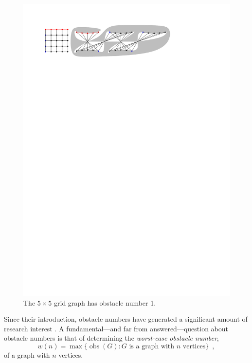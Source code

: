 \documentclass{patmorin}
\DeclareMathOperator{\obs}{obs}
\begin{document}
\begin{figure}
  \begin{center}
    \includegraphics{fivebyfive}
  \end{center}  
  \caption{The $5\times 5$ grid graph has obstacle number 1.}
\end{figure}

Since their introduction, obstacle numbers have generated a significant
amount of research interest 
\cite{%
   fulek.saeedi:convex,%
   johnson.sarioz:computing,%
   mukkamala.pach.ea:lower,%
   mukkamala.pach.ea:graphs,%
   pach.sarioz:small,%
   pach.sarioz:on,%
   sarioz:approximating%
}.
A fundamental---and far from answered---question about obstacle numbers
is that of determining the \emph{worst-case obstacle number},
\[
    w(n) = \max \{\obs(G) :\mbox{$G$ is a graph with $n$ vertices}\}
    \enspace ,
\] 
of a graph with $n$ vertices.
\end{document}
